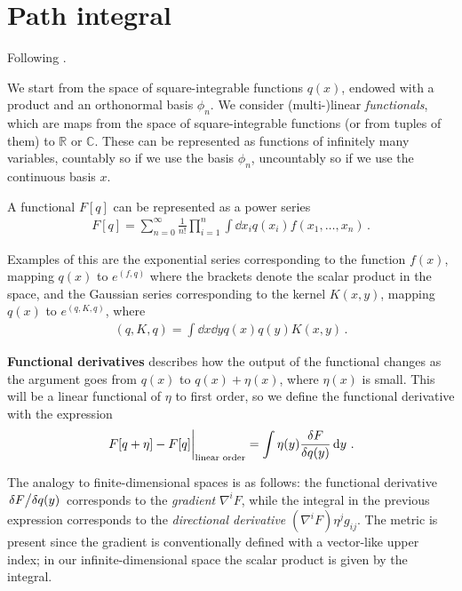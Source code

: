 \documentclass[main.tex]{subfiles}
\begin{document}
\section{Path integral} \label{sec:path-integral}

Following \cite[]{zaidiFunctionalMethods1983}.

We start from the space of square-integrable functions \(q(x)\), endowed with a product and an orthonormal basis \(\phi _n\).
We consider (multi-)linear \emph{functionals}, which are maps from the space of square-integrable functions (or from tuples of them) to \(\mathbb{R}\) or \(\mathbb{C}\). 
These can be represented as functions of infinitely many variables, countably so if we use the basis \(\phi _n\), uncountably so if we use the continuous basis \(x\).

A functional \(F[q]\) can be represented as a power series 
%
\begin{align}
F[q] = \sum _{n=0}^{\infty } \frac{1}{n!} \prod_{i=1}^{n} \int \dd{x_i} q(x_i) f(x_1, \dots, x_n)
\,.
\end{align}

Examples of this are the exponential series corresponding to the function \(f(x)\), mapping \(q(x)\) to \(e^{(f, q)}\) where the brackets denote the scalar product in the space, and the Gaussian series corresponding to the kernel \(K(x, y)\), mapping \(q(x)\) to \(e^{(q, K, q)}\), where 
%
\begin{align}
(q, K, q) = \int \dd{x} \dd{y} q(x) q(y) K(x, y)
\,.
\end{align}

\textbf{Functional derivatives} describes how the output of the functional changes as the argument goes from \(q(x)\) to \(q(x) + \eta (x)\), where \(\eta (x)\) is small. 
This will be a linear functional of \(\eta \) to first order, so we define the functional derivative with the expression 
%
\begin{align}
\eval{F[q+\eta ] - F[q]}_{\text{linear order}} = \int \eta (y) \fdv{F}{q (y)} \dd{y}
\,.
\end{align}

The analogy to finite-dimensional spaces is as follows: the functional derivative \(\fdv*{F}{q(y)}\) corresponds to the \emph{gradient} \(\nabla^{i} F\), while the integral in the previous expression corresponds to the \emph{directional derivative} \((\nabla^{i} F) \eta^{j} g_{ij}\).
The metric is present since the gradient is conventionally defined with a vector-like upper index; in our infinite-dimensional space the scalar product is given by the integral.
\end{document}
